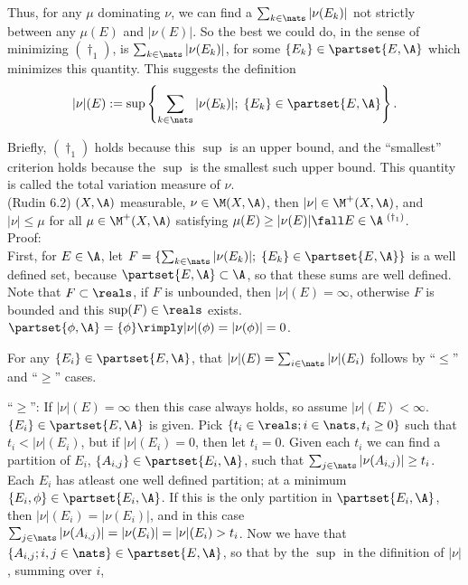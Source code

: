 \noindent
Thus, for any $\mu$ dominating $\nu$, we can find a $\sum_{k \in \nats} |\nu(E_k)|$ not strictly between any $\mu(E)$ and $|\nu(E)|$. So the best we could do, in the sense of minimizing ${(\dagger_1)}$, is $\sum_{k \in \nats} |\nu(E_k)|$, for some $ \{ E_k\} \in \partset{E, \A}$ which minimizes this quantity. This suggests the definition\\

$$
|\nu|(E) := \sup \left\{  \sum_{k \in \nats} |\nu(E_k)| ; \; \{ E_k\} \in \partset{E, \A}  \right\}.
$$

\noindent   
Briefly, ${(\dagger_1)}$ holds because this $\sup$ is an upper bound, and the ``smallest'' criterion holds because the $\sup$ is the smallest such upper bound. This quantity is called the total variation measure of $\nu$. \\






(Rudin 6.2) $(X, \A)$ measurable, $\nu \in \M(X,\A)$, then $|\nu| \in \M^+(X, \A)$, and $|\nu| \le \mu$ for all $\mu  \in \M^+(X, \A)$ satisfying  $\mu(E)  \ge |\nu(E)| \fall E \in \A \; {}^{(\dagger_1)} $. \\


Proof: \\

\noindent
First, for $E \in \A$, let $ F = \{  \sum_{k \in \nats} |\nu(E_k)| ; \; \{ E_k\} \in \partset{E, \A}  \}$ is a well defined set, because $\partset{E, \A} \subset \A$, so that these sums are well defined. Note that $F \subset \reals$, if $F$ is unbounded, then $|\nu|(E) = \infty$, otherwise $F$ is bounded and this $\sup(F) \in \reals$ exists. \\


\noindent
 $\partset{\phi, \A} = \{ \phi \} \rimply |\nu|(\phi) = |\nu(\phi)| = 0$. 

\noindent 
For any $\{ E_i \} \in \partset{E, \A}$, that $|\nu|(E) = \sum_{i \in \nats} |\nu|(E_i)$ follows by ``$\le$'' and ``$\ge$'' cases. \\


\noindent


\noindent
``$\ge$'': If $|\nu|(E) = \infty$ then this case always holds, so assume $|\nu|(E) < \infty$. $\{ E_i \} \in \partset{ E, \A }$ is given. Pick $\{ t_i \in \reals; i \in \nats, t_i \ge 0 \}$ such that $t_i < |\nu|(E_i)$, but if $|\nu|(E_i) = 0$, then let $t_i = 0$. Given each $t_i$ we can find a partition of $E_i$, $\{A_{i,j} \} \in \partset{E_i, \A}$, such that $\sum_{j \in \nats} |\nu(A_{i,j})| \ge t_i$. Each $E_i$ has atleast one well defined partition; at a minimum $\{E_i, \phi \} \in \partset{E_i, \A}$. If this is the only partition in $\partset{E_i, \A}$, then $|\nu|(E_i) = |\nu(E_i)|$, and in this case $\sum_{j \in \nats} |\nu(A_{i,j})| = |\nu(E_i)| = |\nu|(E_i) > t_i$.  Now we have that $\{ A_{i,j}; i,j \in \nats \} \in \partset{E, \A}$, so that by the $\sup$ in the difinition of $|\nu|$, summing over $i$,

